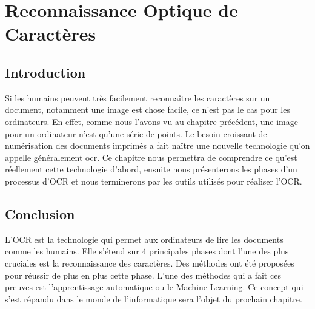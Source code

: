 \chapter{\textbf{Reconnaissance Optique de Caractères}}
    \section{Introduction}
    Si les humains peuvent très facilement reconnaître les caractères sur un document, notamment une image est chose facile, ce n’est pas le cas pour les ordinateurs. En effet, comme nous l’avons vu au chapitre précédent, une image pour un ordinateur n’est qu’une série de points. Le besoin croissant de numérisation des documents imprimés a fait naître une nouvelle technologie qu’on appelle généralement \acrfull{ocr}. Ce chapitre nous permettra de comprendre ce qu'est réellement cette technologie d’abord, ensuite nous présenterons les phases d’un processus d’OCR et nous terminerons par les outils utilisés pour réaliser l’OCR.
    
    
    
    

    \section{Conclusion}
    L’OCR est la technologie qui permet aux ordinateurs de lire les documents comme les humains. Elle s’étend sur 4 principales phases dont l’une des plus cruciales est la reconnaissance des caractères. Des méthodes ont été proposées pour réussir de plus en plus cette phase. L’une des méthodes qui a fait ces preuves est l’apprentissage automatique ou le Machine Learning. Ce concept qui s’est répandu dans le monde de l’informatique sera l’objet du prochain chapitre.